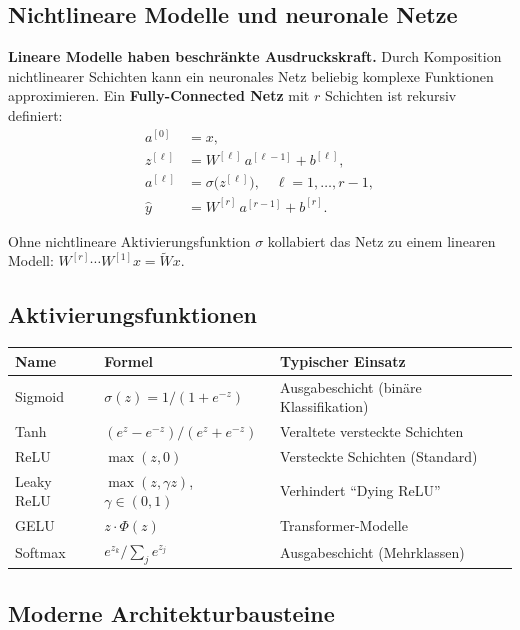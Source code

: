 \documentclass[11pt]{article}
\theoremstyle{csthm}
\theoremstyle{csdef}
\begin{document}
\subsection{Nichtlineare Modelle und neuronale Netze}

\textbf{Lineare Modelle haben beschränkte Ausdruckskraft.} Durch Komposition
nichtlinearer Schichten kann ein neuronales Netz beliebig komplexe Funktionen
approximieren. Ein \textbf{Fully-Connected Netz} mit $r$ Schichten ist
rekursiv definiert:
\begin{align}
  a^{[0]} &= x, \\
  z^{[\ell]} &= W^{[\ell]}\, a^{[\ell-1]} + b^{[\ell]}, \\
  a^{[\ell]} &= \sigma\!\bigl(z^{[\ell]}\bigr), \quad \ell = 1,\ldots,r-1,\\
  \hat y &= W^{[r]}\, a^{[r-1]} + b^{[r]}.
\end{align}

Ohne nichtlineare Aktivierungsfunktion $\sigma$ kollabiert das Netz zu einem
linearen Modell: $W^{[r]}\cdots W^{[1]}x = \tilde W x$.

\subsection{Aktivierungsfunktionen}

\begin{center}
\begin{tabular}{lll}
\toprule
Name & Formel & Typischer Einsatz \\
\midrule
Sigmoid & $\sigma(z) = 1/(1+e^{-z})$ & Ausgabeschicht (binäre Klassifikation) \\
Tanh & $(e^z - e^{-z})/(e^z + e^{-z})$ & Veraltete versteckte Schichten \\
ReLU & $\max(z, 0)$ & Versteckte Schichten (Standard) \\
Leaky ReLU & $\max(z, \gamma z)$, $\gamma \in (0,1)$ & Verhindert ``Dying ReLU'' \\
GELU & $z \cdot \Phi(z)$ & Transformer-Modelle \\
Softmax & $e^{z_k}/\sum_j e^{z_j}$ & Ausgabeschicht (Mehrklassen) \\
\bottomrule
\end{tabular}
\end{center}

\subsection{Moderne Architekturbausteine}
\end{document}
